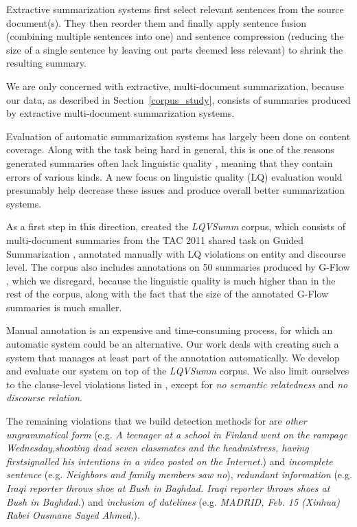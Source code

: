 \documentclass[a4paper,10pt]{scrartcl}
\theoremstyle{style}
\begin{document}
Extractive summarization systems first select relevant sentences from the source document(s). They then reorder them and finally apply sentence fusion (combining multiple sentences into one) and sentence compression (reducing the size of a single sentence by leaving out parts deemed less relevant) to shrink the resulting summary.

We are only concerned with extractive, multi-document summarization, because our data, as described in Section~\ref{corpus_study}, consists of summaries produced by extractive multi-document summarization systems.

Evaluation of automatic summarization systems has largely been done on content coverage. Along with the task being hard in general, this is one of the reasons generated summaries often lack linguistic quality \citep{nenkova2011foundations}, meaning that they contain errors of various kinds. A new focus on linguistic quality (LQ) evaluation would presumably help decrease these issues and produce overall better summarization systems.

As a first step in this direction, \cite{friedrichlqvsumm} created the \textit{LQVSumm} corpus, which consists of multi-document summaries from the TAC 2011 shared task on Guided Summarization \citep{owczarzak2011overview}, annotated manually with LQ violations on entity and discourse level.
The corpus also includes annotations on 50 summaries produced by G-Flow \citep{gflow}, which we disregard, because the linguistic quality is much higher than in the rest of the corpus, along with the fact that the size of the annotated G-Flow summaries is much smaller.

Manual annotation is an expensive and time-consuming process, for which an automatic system could be an alternative. Our work deals with creating such a system that manages at least part of the annotation automatically. We develop and evaluate our system on top of the \textit{LQVSumm} corpus. We also limit ourselves to the clause-level violations listed in \cite{friedrichlqvsumm}, except for \textit{no semantic relatedness} and \textit{no discourse relation}.

The remaining violations that we build detection methods for are \textit{other ungrammatical form} (e.g. \textit{A teenager at a school in Finland went on the rampage Wednesday,shooting dead seven classmates and the headmistress, having firstsignalled his intentions in a video posted on the Internet.}) and \textit{incomplete sentence} (e.g. \textit{Neighbors and family members saw no}), \textit{redundant information} (e.g. \textit{Iraqi reporter throws shoe at Bush in Baghdad. Iraqi reporter throws shoes at Bush in Baghdad.}) and \textit{inclusion of datelines} (e.g. \textit{MADRID, Feb. 15 (Xinhua) Rabei Ousmane Sayed Ahmed,}).
\end{document}
